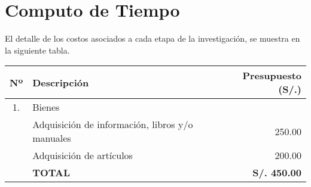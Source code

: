 \documentclass[a4paper,11pt,oneside]{article}
\begin{document}
\section{Computo de Tiempo}
El detalle de los costos asociados a cada etapa de la investigación, se muestra en la siguiente tabla.
\begin{table}[H]
\centering
\begin{tabular}{clr}
\toprule
\rowcolor{gray!10}\bf Nº & \bf Descripción & \bf Presupuesto (S/.) \\
\midrule
1. & Bienes  & \\	
 & Adquisición de información, libros y/o manuales & 250.00 \\
 & Adquisición de artículos  & 200.00 \\
\midrule
& \bf TOTAL & \bf S/. 450.00 \\
\bottomrule
\end{tabular}
\end{table}
\end{document}
